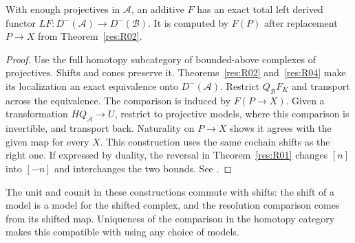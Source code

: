 \begin{theorem}\label{res:R07}
With enough projectives in \(\mathcal A\), an additive \(F\) has an
exact total left derived functor \(LF:D^-(\mathcal A)\to D^-(\mathcal B)\).
It is computed by \(F(P)\) after replacement \(P\to X\) from
Theorem~\ref{res:R02}.
\end{theorem}
\begin{proof}
Use the full homotopy subcategory of bounded-above complexes of
projectives. Shifts and cones preserve it. Theorems~\ref{res:R02}
and~\ref{res:R04} make its localization an exact equivalence onto
\(D^-(\mathcal A)\). Restrict \(Q_{\mathcal B}F_K\) and transport
across the equivalence. The comparison is induced by \(F(P\to X)\).
Given a transformation \(H Q_{\mathcal A}\to U\), restrict to projective
models, where this comparison is invertible, and transport back.
Naturality on \(P\to X\) shows it agrees with the given map for every \(X\).
This construction uses the same cochain shifts as the right one.
If expressed by duality, the reversal in Theorem~\ref{res:R01}
changes \([n]\) into \([-n]\) and interchanges the two bounds.
See \cite[Theorem 8.4.23]{yekutieli}.
\end{proof}

The unit and counit in these constructions commute with shifts:
the shift of a model is a model for the shifted complex, and
the resolution comparison comes from its shifted map. Uniqueness
of the comparison in the homotopy category makes this compatible
with using any choice of models.

